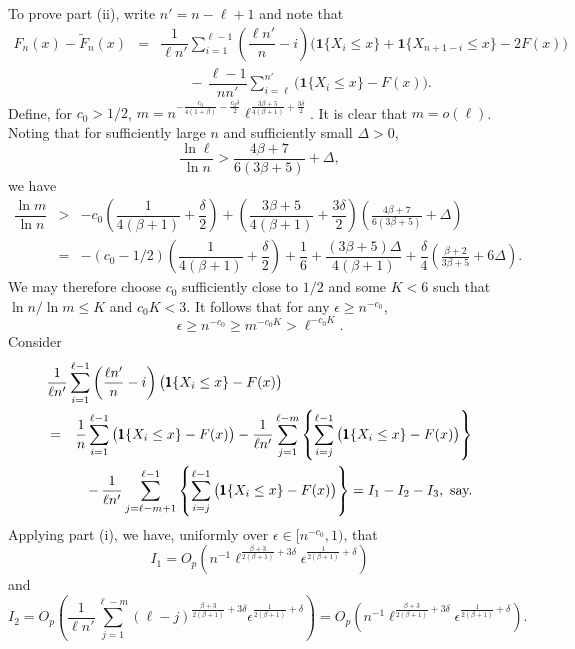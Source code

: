 \documentclass[a4paper, 12pt]{article}
\theoremstyle{plain}
\theoremstyle{definition}
\begin{document}
To prove part (ii), write $n'=n-\ell+1$ and note that
\begin{eqnarray}
F_n(x)-\tilde{F}_n(x)&=&
\dfrac{1}{\ell n'}\sum_{i=1}^{\ell-1}
\left(\dfrac{\ell n'}{n}-i\right)\big(\pmb{1}\{X_i\le x\}
+\pmb{1}\{X_{n+1-i}\le x\}-2F(x)\big)\nonumber\\
&&\qquad-\,\dfrac{\ell-1}{nn'}\sum_{i=\ell}^{n'}\big(\pmb{1}\{X_{i}\le x\}-F(x)\big).
\label{pf:empcdf2}
\end{eqnarray}
Define, for $c_0>1/2$, $\displaystyle m=
n^{-\frac{c_0}{4(1+\beta)}-\frac{c_0\delta}{2}}\ell^{\frac{3\beta+5}{4(\beta+1)}+\frac{3\delta}{2}}$.
It is clear that $m=o(\ell)$. Noting that for sufficiently large $n$
and sufficiently small $\Delta>0$,
\[ \dfrac{\ln\ell}{\ln n}
>\frac{4\beta+7}{6(3\beta+5)}+\Delta, \]
we have
\begin{eqnarray*}
\dfrac{\ln m}{\ln n}
&>&-c_0\left(\dfrac{1}{4(\beta+1)}+\dfrac{\delta}{2}\right)+
\left(\dfrac{3\beta+5}{4(\beta+1)}+\dfrac{3\delta}{2}\right)\left(\frac{4\beta+7}{6(3\beta+5)}+\Delta\right)\\
&=&-(c_0-1/2)\left(\dfrac{1}{4(\beta+1)}+\dfrac{\delta}{2}\right)+\dfrac{1}{6}+
\dfrac{(3\beta+5)\Delta}{4(\beta+1)}+\dfrac{\delta}{4}\left(\frac{\beta+2}{3\beta+5}+6\Delta\right).
\end{eqnarray*}
We may therefore choose $c_0$ sufficiently close to $1/2$ and some $K<6$ such that
$\ln n/\ln m\le K$ and $c_0K<3$. It follows that for any $\epsilon\ge n^{-c_0}$,
\[ \epsilon\ge n^{-c_0}\ge m^{-c_0K}>\ell^{-c_0K}. \]
Consider
\begin{eqnarray}
\lefteqn{
\dfrac{1}{\ell n'}\sum_{i=1}^{\ell-1}
\left(\dfrac{\ell n'}{n}-i\right)\big(\pmb{1}\{X_{i}\le x\}-F(x)\big)}\nonumber\\
&=&
\dfrac{1}{n}\sum_{i=1}^{\ell-1}\big(\pmb{1}\{X_i\le x\}-F(x)\big)-\dfrac{1}{\ell n'}
\sum_{j=1}^{\ell-m}\left\{\sum_{i=j}^{\ell-1}\big(\pmb{1}\{X_i\le x\}-F(x)\big)\right\}\nonumber\\
&&-\,\dfrac{1}{\ell n'}
\sum_{j=\ell-m+1}^{\ell-1}\left\{\sum_{i=j}^{\ell-1}\big(\pmb{1}\{X_i\le x\}-F(x)\big)\right\}
=I_1-I_2-I_3, \text{\ say.}\nonumber
\end{eqnarray}
Applying part (i), we have, uniformly over $\epsilon\in\big[n^{-c_0},1\big)$, that
\[
I_1=O_p\left(n^{-1}\ell^{\frac{\beta+3}{2(\beta+1)}+3\delta}
\epsilon^{\frac{1}{2(\beta+1)}+\delta}\right)
\]
and
\[
I_2=O_p\left(
\dfrac{1}{\ell n'}
\sum_{j=1}^{\ell-m}(\ell-j)^{\frac{\beta+3}{2(\beta+1)}+3\delta}
\epsilon^{\frac{1}{2(\beta+1)}+\delta}\right)=O_p\left(n^{-1}\ell^{\frac{\beta+3}{2(\beta+1)}+3\delta}
\epsilon^{\frac{1}{2(\beta+1)}+\delta}\right).
\]
\end{document}
